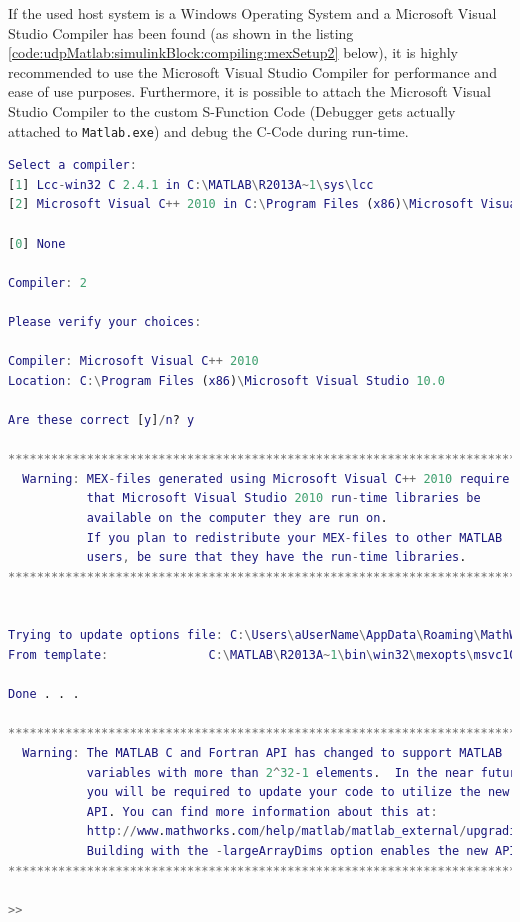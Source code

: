 If the used host system is a Windows Operating System and a Microsoft Visual Studio Compiler has been found (as shown in the listing \ref{code:udpMatlab:simulinkBlock:compiling:mexSetup2} below), it is highly recommended to use the Microsoft Visual Studio Compiler for performance and ease of use purposes. Furthermore, it is possible to attach the Microsoft Visual Studio Compiler to the custom S-Function Code (Debugger gets actually attached to \texttt{Matlab.exe}) and debug the C-Code during run-time.

\begin{lstlisting}[language=MATLAB,caption=Configuration of MATLAB's mex compiler (part 2),label=code:udpMatlab:simulinkBlock:compiling:mexSetup2]
Select a compiler: 
[1] Lcc-win32 C 2.4.1 in C:\MATLAB\R2013A~1\sys\lcc 
[2] Microsoft Visual C++ 2010 in C:\Program Files (x86)\Microsoft Visual Studio 10.0 
 
[0] None 
 
Compiler: 2
 
Please verify your choices: 
 
Compiler: Microsoft Visual C++ 2010  
Location: C:\Program Files (x86)\Microsoft Visual Studio 10.0 
 
Are these correct [y]/n? y
 
*************************************************************************** 
  Warning: MEX-files generated using Microsoft Visual C++ 2010 require 
           that Microsoft Visual Studio 2010 run-time libraries be  
           available on the computer they are run on. 
           If you plan to redistribute your MEX-files to other MATLAB 
           users, be sure that they have the run-time libraries. 
*************************************************************************** 
 
 
Trying to update options file: C:\Users\aUserName\AppData\Roaming\MathWorks\MATLAB\R2013a\mexopts.bat 
From template:              C:\MATLAB\R2013A~1\bin\win32\mexopts\msvc100opts.bat 
 
Done . . . 
 
************************************************************************** 
  Warning: The MATLAB C and Fortran API has changed to support MATLAB 
           variables with more than 2^32-1 elements.  In the near future 
           you will be required to update your code to utilize the new 
           API. You can find more information about this at: 
           http://www.mathworks.com/help/matlab/matlab_external/upgrading-mex-files-to-use-64-bit-api.html  
           Building with the -largeArrayDims option enables the new API. 
************************************************************************** 
 
>>
\end{lstlisting}

